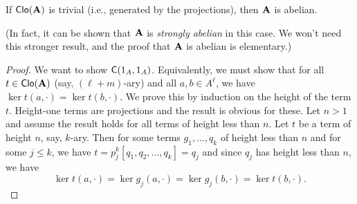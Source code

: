 {\begin{lemma}
\label{lem:triv-clone-implies-abelian}
If $\operatorname{\mathsf{Clo}}(\mathbf{A})$ is trivial (i.e., generated by the projections),
then $\mathbf{A}$ is abelian.
\end{lemma}
(In fact, it can be shown that $\mathbf{A}$ is \emph{strongly abelian} in this case. 
We won't need this stronger result, and the proof that $\mathbf{A}$ is abelian is elementary.)
\begin{proof}
We want to show $\mathsf{C}(1_A, 1_A)$.  Equivalently, we must show
that for all $t\in \operatorname{\mathsf{Clo}}(\mathbf{A})$ (say, $(\ell+m)$-ary) 
and all $a, b \in A^\ell$, we have $\ker t(a,\cdot)=\ker t(b,\cdot)$.
We prove this by induction on the height of the term $t$.  Height-one terms are
projections and the result is obvious for these.  Let $n>1$ and assume the result
holds for all terms  of height less than
$n$.  Let $t$ be a term of height $n$, say, $k$-ary.  Then for some terms 
$g_1, \dots, q_k$ of height less than $n$ and for some $j\leq k$, we have
$t = p^k_j [q_1, q_2, \dots, q_k] = q_j$ and since $q_j$ has height less than
$n$, we have
\[
\ker t(a,\cdot)=\ker g_j(a,\cdot) = \ker g_j(b,\cdot)=\ker t(b,\cdot).
\]\end{proof}
}{}









